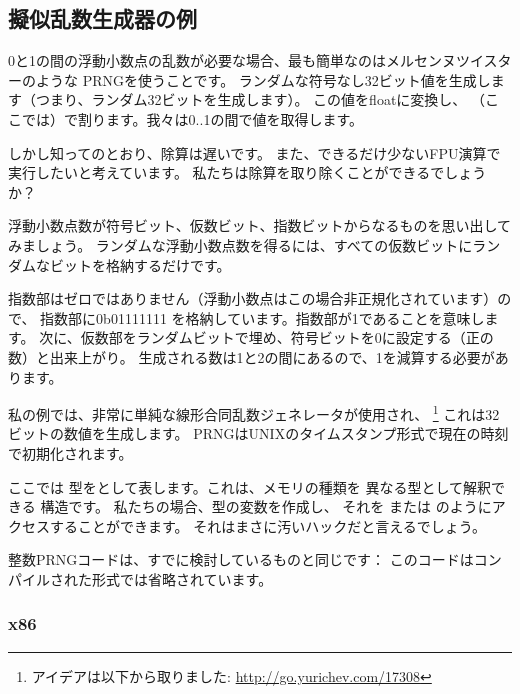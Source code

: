 \subsection{擬似乱数生成器の例}
\label{FPU_PRNG}

0と1の間の浮動小数点の乱数が必要な場合、最も簡単なのはメルセンヌツイスターのような
\ac{PRNG}を使うことです。
ランダムな符号なし32ビット値を生成します（つまり、ランダム32ビットを生成します）。
この値をfloatに変換し、
（ここでは）で割ります。我々は0..1の間で値を取得します。

しかし知ってのとおり、除算は遅いです。
また、できるだけ少ないFPU演算で実行したいと考えています。
私たちは除算を取り除くことができるでしょうか？


浮動小数点数が符号ビット、仮数ビット、指数ビットからなるものを思い出してみましょう。
ランダムな浮動小数点数を得るには、すべての仮数ビットにランダムなビットを格納するだけです。

指数部はゼロではありません（浮動小数点はこの場合非正規化されています）ので、
指数部に0b01111111
を格納しています。指数部が1であることを意味します。
次に、仮数部をランダムビットで埋め、符号ビットを0に設定する（正の数）と出来上がり。
生成される数は1と2の間にあるので、1を減算する必要があります。

\newcommand{\URLXOR}{\url{http://go.yurichev.com/17308}}

私の例では、非常に単純な線形合同乱数ジェネレータが使用され、
\footnote{アイデアは以下から取りました: \URLXOR} これは32ビットの数値を生成します。 
\ac{PRNG}はUNIXのタイムスタンプ形式で現在の時刻で初期化されます。

ここでは \Tfloat 型をとして表します。これは、メモリの種類を
異なる型として解釈できる \CCpp 構造です。
私たちの場合、型の変数を作成し、
それを \Tfloat  または  のようにアクセスすることができます。
それはまさに汚いハックだと言えるでしょう。


整数\ac{PRNG}コードは、すでに検討しているものと同じです：
このコードはコンパイルされた形式では省略されています。



\subsubsection{x86}

